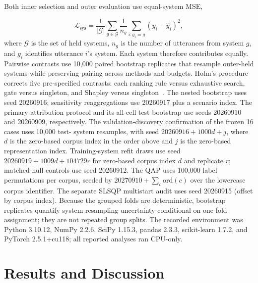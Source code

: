 \documentclass{article}
\begin{document}
Both inner selection and outer evaluation use equal-system MSE,


\begin{equation}
\mathcal{L}_{\mathrm{sys}}
=
\frac{1}{|\mathcal{G}|}
\sum_{g\in\mathcal{G}}
\frac{1}{n_g}
\sum_{i:g_i=g}
(y_i-\hat y_i)^2 ,
\label{eq:systemmse}
\end{equation}
where $\mathcal{G}$ is the set of held systems, $n_g$ is the number of
utterances from system $g$, and $g_i$ identifies utterance $i$'s system. Each
system therefore contributes equally. Pairwise contrasts use 10{,}000 paired
bootstrap replicates that resample outer-held systems while preserving pairing
across methods and budgets. Holm's procedure corrects five pre-specified
contrasts: each ranking rule versus exhaustive search, gate versus singleton,
and Shapley versus singleton~\cite{holm1979procedure}.
The nested bootstrap uses seed 20260916; sensitivity reaggregations use
20260917 plus a scenario index. The primary attribution protocol and its
all-cell test bootstrap use seeds 20260910 and 20260909, respectively. The
validation-discovery confirmation of the frozen 16 cases uses 10{,}000 test-
system resamples, with seed $20260916+1000d+j$, where $d$ is the zero-based
corpus index in the order above and $j$ is the zero-based representation
index. Training-system refit draws use seed $20260919+1009d+104729r$ for
zero-based corpus index $d$ and replicate $r$; matched-null controls use seed
20260912. The QAP uses 100{,}000 label
permutations per corpus, seeded by
$20270910+\sum_c\mathrm{ord}(c)$ over the lowercase corpus identifier. The
separate SLSQP multistart audit uses seed 20260915 (offset by corpus index).
Because the grouped folds are deterministic, bootstrap replicates quantify
system-resampling uncertainty conditional on one fold assignment; they are not
repeated group splits.
The recorded environment was Python 3.10.12, NumPy 2.2.6, SciPy 1.15.3,
pandas 2.3.3, scikit-learn 1.7.2, and PyTorch 2.5.1+cu118; all reported
analyses ran CPU-only.






\section{Results and Discussion}
\label{sec:results}
\end{document}
